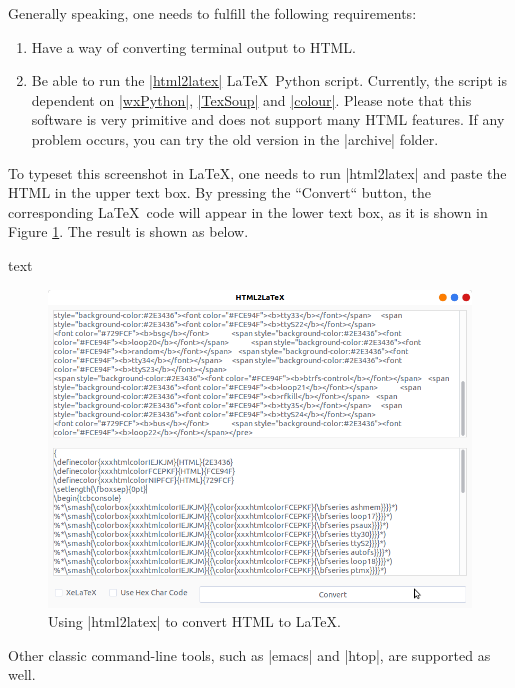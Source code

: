 \documentclass[letterpaper, 11pt, DIV=11]{scrartcl}
\begin{document}
Generally speaking, one needs to fulfill the following requirements:
\begin{enumerate}
\item Have a way of converting terminal output to HTML.
\item Be able to run the \href{https://github.com/xziyue/latex-beautiful-listings-screenshot/blob/master/html2tex_gui.py}{\rawinline|html2latex|} \LaTeX\ Python script. Currently, the script is dependent on \href{https://pypi.org/project/wxPython/}{\rawinline|wxPython|}, \href{https://pypi.org/project/TexSoup/}{\rawinline|TexSoup|} and \href{https://pypi.org/project/colour/}{\rawinline|colour|}. Please note that this software is very primitive and does not support many HTML features. If any problem occurs, you can try the old version in the \rawinline|archive| folder.
\end{enumerate}

To typeset this screenshot in \LaTeX, one needs to run \rawinline|html2latex| and paste the HTML in the upper text box. By pressing the ``Convert`` button, the corresponding \LaTeX\ code will appear in the lower text box, as it is shown in Figure \ref{fig:python-html2latex}. The result is shown as below.

\begin{tcbsrccode}{text}

\end{tcbsrccode}


\begin{figure}[htpb]
\centering
\includegraphics[width=0.7\linewidth]{../../res/html2latex}
\caption{Using \rawinline|html2latex| to convert HTML to \LaTeX.}
\label{fig:python-html2latex}
\end{figure} 

Other classic command-line tools, such as \rawinline|emacs| and \rawinline|htop|, are supported as well.
\end{document}
